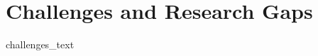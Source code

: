 \documentclass[conference]{IEEEtran}
\begin{document}


\section{Challenges and Research Gaps}
{{ challenges_text }}


\end{document}
